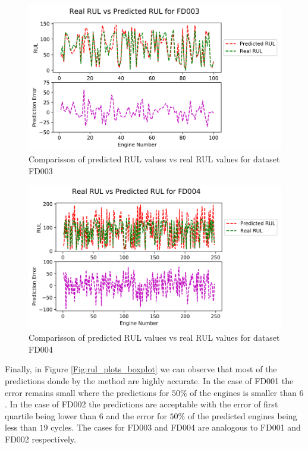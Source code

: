 \documentclass[preprint,12pt]{elsarticle}%
\begin{document}
\begin{figure}[!h]
\begin{center}
\includegraphics[scale=0.70]{Figures/rul_plots_dataset_3.png}
\caption{Comparisson of predicted RUL values vs real RUL values for dataset FD003}
\label{Fig:rul_plots_dataset_3}
\end{center}
\end{figure}

\begin{figure}[!h]
\begin{center}
\includegraphics[scale=0.70]{Figures/rul_plots_dataset_4.png}
\caption{Comparisson of predicted RUL values vs real RUL values for dataset FD004}
\label{Fig:rul_plots_dataset_4}
\end{center}
\end{figure}

\pagebreak

Finally, in Figure \ref{Fig:rul_plots_boxplot} we can observe that most of the predictions donde by the method are highly accurate. In the case of FD001 the error remains small where the predictions for $50\%$ of the engines is smaller than $6$. In the case of FD002 the predictions are acceptable with the error of first quartile being lower than $6$ and the error for $50\%$ of the predicted engines being less than $19$ cycles. The cases for FD003 and FD004 are analogous to FD001 and FD002 respectively.
\end{document}
